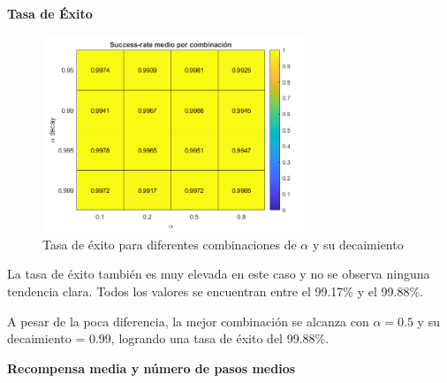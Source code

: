 \textbf{Tasa de Éxito}

\begin{figure}[H]
    \centering
    \includegraphics[width=0.7\textwidth]{../../experiments/qlearning/experiment-3/results/success.png}
    \caption{Tasa de éxito para diferentes combinaciones de $\alpha$ y su decaimiento}
    \label{fig:qlearning-success}
\end{figure}
La tasa de éxito también es muy elevada en este caso y no se observa ninguna tendencia clara. Todos los valores se encuentran entre el 99.17\% y el 99.88\%. 

A pesar de la poca diferencia, la mejor combinación se alcanza con $\alpha = 0.5$ y su decaimiento = 0.99, logrando una tasa de éxito del 99.88\%.


\newpage

\textbf{Recompensa media y número de pasos medios}

